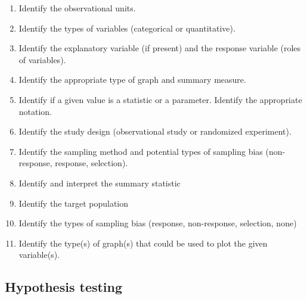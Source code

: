 \documentclass[
]{report}
\begin{document}
\begin{enumerate}
\def\labelenumi{\arabic{enumi}.}
\item
  Identify the observational units.
\item
  Identify the types of variables (categorical or quantitative).
\item
  Identify the explanatory variable (if present) and the response variable (roles of variables).
\item
  Identify the appropriate type of graph and summary measure.
\item
  Identify if a given value is a statistic or a parameter. Identify the appropriate notation.
\item
  Identify the study design (observational study or randomized experiment).
\item
  Identify the sampling method and potential types of sampling bias (non-response, response, selection).
\item
  Identify and interpret the summary statistic
\item
  Identify the target population
\item
  Identify the types of sampling bias (response, non-response, selection, none)
\item
  Identify the type(s) of graph(s) that could be used to plot the given variable(s).
\end{enumerate}

\subsection*{Hypothesis testing}\label{hypothesis-testing-1}
\end{document}
